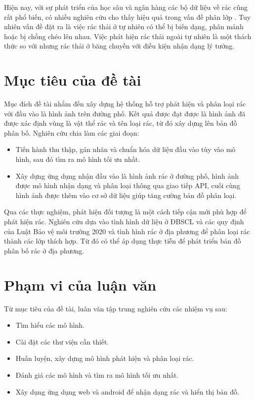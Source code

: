 \documentclass[../the.tex]{subfiles}
\begin{document}
{\fontsize{13}{12} \selectfont 
Hiện nay, với sự phát triển của học sâu và ngân hàng các bộ dữ liệu về rác cũng rất phổ biến, có nhiều nghiên cứu cho thấy hiệu quả trong vấn đề phân lớp \cite{yang2016classification} \cite{shah2022method} \cite{ahmad2020intelligent}. 
Tuy nhiên vấn đề đặt ra là việc rác thải ở tự nhiên có thể bị biến dạng, phân mảnh hoặc bị chồng chéo lên nhau. Việc phát hiện rác thải ngoài tự nhiên là một thách thức so với nhưng rác thải ở băng chuyền với điều kiện nhận dạng lý tưởng.


}


\section{Mục tiêu của đề tài}
\label{muc_tieu}


{\fontsize{13}{12} \selectfont
Mục đích đề tài nhắm đến xây dựng hệ thống hỗ trợ phát hiện và phân loại rác với đầu vào là hình ảnh trên đường phố. Kết quả được đạt được là hình ảnh đã được xác định vùng là vật thể rác và tên loại rác, từ đó xây dựng lên bản đồ phân bố. Nghiên cứu chia làm các giai đoạn:
\begin{itemize}
  \item Tiến hành thu thập, gán nhãn và chuẩn hóa dữ liệu đầu vào tùy vào mô hình, sau đó tìm ra mô hình tối ưu nhất.
  
  \item Xây dựng ứng dụng nhận đầu vào là hình ảnh rác ở đường phố, hình ảnh được mô hình nhận dạng và phân loại thông qua giao tiếp API, cuối cùng hình ảnh được thêm vào cơ sở dữ liệu giúp tăng cường bản đồ phân loại.
 
\end{itemize}
}
\bigskip

{\fontsize{13}{12} \selectfont
Qua các thực nghiệm, phát hiện đối tượng là một cách tiếp cận mới phù hợp để phát hiện rác. Nghiên cứu dựa vào tình hình dữ liệu ở ĐBSCL và các quy định của Luật Bảo vệ môi trường 2020 và tình hình rác ở địa phương để phân loại rác thành các lớp thích hợp. Từ đó có thể áp dụng thực tiễn để phát triển bản đồ phân bố rác ở địa phương. }


\section{Phạm vi của luận văn}
\label{pham_vi}

{\fontsize{13}{12} \selectfont
Từ mục tiêu của đề tài, luân văn tập trung nghiên cứu các nhiệm vụ sau:
\begin{itemize}
  \item Tìm hiểu các mô hình.
  \item Cài đặt các thư viện cần thiết.
  \item Huấn luyện, xây dựng mô hình phát hiện và phân loại rác.
  \item Đánh giá các mô hình và tìm ra mô hình tối ưu nhất.
  \item Xây dụng ứng dụng web và android để nhận dạng rác và hiển thị bản đồ.
\end{itemize}
}
\end{document}
